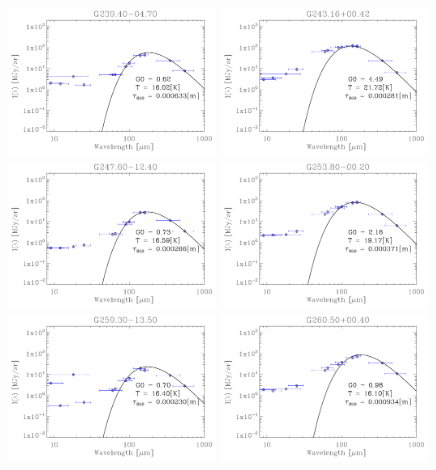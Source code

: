 \begin{figure}
\includegraphics[trim=-1mm -1mm -1mm -1mm, clip, width=55mm]{appB/appB_60.pdf}
\includegraphics[trim=-1mm -1mm -1mm -1mm, clip, width=55mm]{appB/appB_61.pdf}
\includegraphics[trim=-1mm -1mm -1mm -1mm, clip, width=55mm]{appB/appB_62.pdf}
\includegraphics[trim=-1mm -1mm -1mm -1mm, clip, width=55mm]{appB/appB_63.pdf}
\includegraphics[trim=-1mm -1mm -1mm -1mm, clip, width=55mm]{appB/appB_64.pdf}
\includegraphics[trim=-1mm -1mm -1mm -1mm, clip, width=55mm]{appB/appB_65.pdf}

\end{figure}
